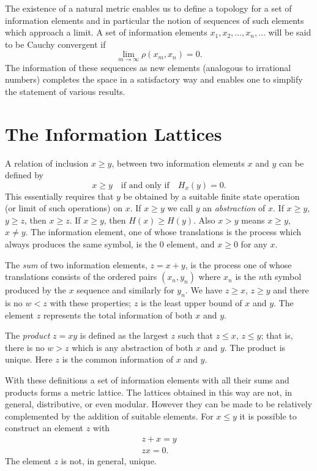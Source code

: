 \documentclass{article}[12pt, letter]
\begin{document}
The existence of a natural metric enables us to define a topology for a set of information elements and in particular the notion of sequences of such elements which approach a limit. A set of information elements $x_1, x_2, \dots, x_n, \dots$ will be said to be Cauchy convergent if 
\[
\lim_{m \to \infty} \rho(x_m,x_n) = 0.
\]
The information of these sequences as new elements (analogous to irrational numbers) completes the space in a satisfactory way and enables one to simplify the statement of various results.

\section{The Information Lattices}

A relation of inclusion $x \geqslant y$, between two information elements $x$ and $y$ can be defined by
\[
x \geqslant y \quad \textrm{if and only if} \quad H_x(y) = 0.
\]
This essentially requires that $y$ be obtained by a suitable finite state operation (or limit of such operations) on $x$. If $x \geqslant y$ we call $y$ an \textit{abstraction} of $x$. If $x \geqslant y$, $y \geqslant z$, then $x \geqslant z$. If $x \geqslant y$, then $H(x) \geq H(y)$.
Also $x > y$ means $x \geqslant y$, $x \neq y$. The information element, one of whose translations is the process which always produces the same symbol, is the $0$ element, and $x \geqslant 0$ for any $x$.

The \textit{sum} of two information elements, $z = x + y$, is the process one of whose translations consists of the ordered pairs $(x_n, y_n)$ where $x_n$ is the $n$th symbol produced by the $x$ sequence and similarly for $y_n$. We have $z \geqslant x$, $z \geqslant y$ and there is no $w < z$ with these properties; $z$ is the least upper bound of $x$ and $y$. The element $z$ represents the total information of both $x$ and $y$.

The \textit{product} $z = x y$ is defined as the largest $z$ such that $z \leqslant x$, $z \leqslant y$; that is, there is no $w > z$ which is any abstraction of both $x$ and $y$. The product is unique. Here $z$ is the common information of $x$ and $y$.

With these definitions a set of information elements with all their sums and products forms a metric lattice. The lattices obtained in this way are not, in general, distributive, or even modular.
However they can be made to be relatively complemented by the addition of suitable elements. For $x \leqslant y$ it is possible to construct an element $z$ with
\begin{align*}
	z + x = y \\
	z x = 0.
\end{align*}
The element $z$ is not, in general, unique.
\end{document}
